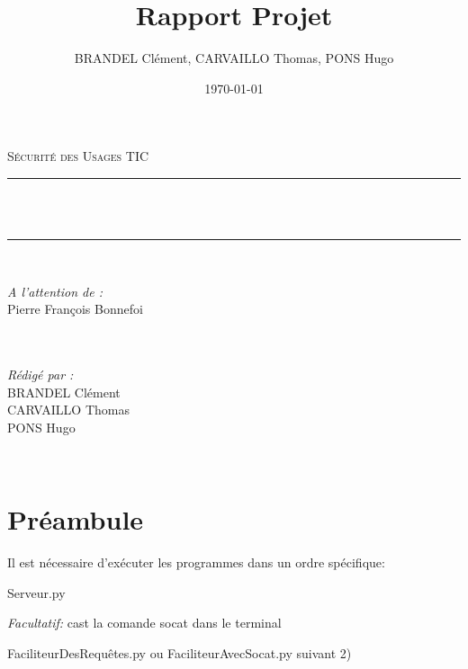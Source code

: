 \documentclass[12pt]{article}
\title{Rapport Projet}
\author{BRANDEL Clément, CARVAILLO Thomas, PONS Hugo}
\date{\today}
\makeatletter
\let\thetitle\@title
\newcommand{\1}{\mathbbm{1}}
\makeatother
\begin{document}

\begin{titlepage}
	\centering
    \vspace*{0.5 cm}
    \textsc{\LARGE Sécurité des Usages TIC}\\[1.0 cm]
	\vspace{1.5cm}
	\rule{\linewidth}{0.2 mm} \\[0.4 cm]
	{ \huge \bfseries  \thetitle}\\ %
	\rule{\linewidth}{0.2 mm} \\[1.5 cm]
	
	\begin{minipage}{0.4\textwidth}
		\begin{flushleft} \large
			\emph{A l'attention de :}\\
			Pierre François Bonnefoi\\
			\phantom{a}\\
			\phantom{a}\\
		\end{flushleft}
	\end{minipage}
	\begin{minipage}{0.5\textwidth}
    	\begin{flushright} \large
		\emph{Rédigé par :}\\
		BRANDEL Clément \\
		CARVAILLO Thomas \\
		PONS Hugo \\
		\end{flushright}
	\end{minipage}\\[2 cm]
\end{titlepage}


\tableofcontents
\vspace{1cm}

\section{Préambule}
Il est nécessaire d'exécuter les programmes dans un ordre spécifique:

\begin{enumerate}
{\large	
	\item Serveur.py
	\item \textit{Facultatif:} cast la comande socat dans le terminal
	\item FaciliteurDesRequêtes.py ou FaciliteurAvecSocat.py suivant 2)
}
\end{enumerate}
\end{document}

